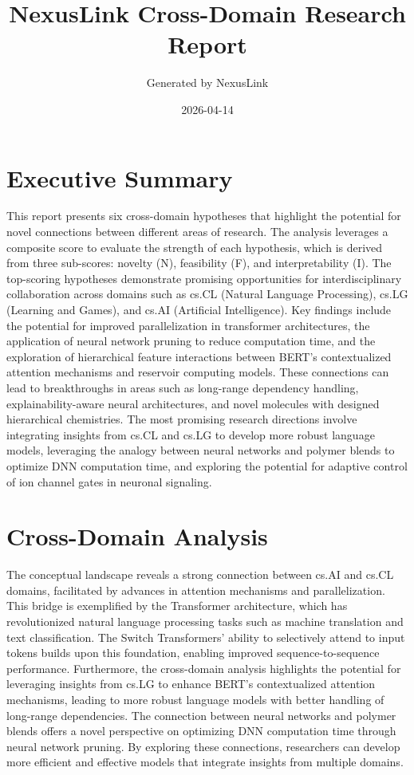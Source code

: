 \documentclass[12pt,a4paper]{article}
\title{NexusLink Cross-Domain Research Report}
\author{Generated by NexusLink}
\date{2026-04-14}
\begin{document}
\maketitle
\tableofcontents
\newpage

\section{Executive Summary}

This report presents six cross-domain hypotheses that highlight the potential for novel connections between different areas of research. The analysis leverages a composite score to evaluate the strength of each hypothesis, which is derived from three sub-scores: novelty (N), feasibility (F), and interpretability (I). The top-scoring hypotheses demonstrate promising opportunities for interdisciplinary collaboration across domains such as cs.CL (Natural Language Processing), cs.LG (Learning and Games), and cs.AI (Artificial Intelligence). Key findings include the potential for improved parallelization in transformer architectures, the application of neural network pruning to reduce computation time, and the exploration of hierarchical feature interactions between BERT's contextualized attention mechanisms and reservoir computing models. These connections can lead to breakthroughs in areas such as long-range dependency handling, explainability-aware neural architectures, and novel molecules with designed hierarchical chemistries. The most promising research directions involve integrating insights from cs.CL and cs.LG to develop more robust language models, leveraging the analogy between neural networks and polymer blends to optimize DNN computation time, and exploring the potential for adaptive control of ion channel gates in neuronal signaling.

\section{Cross-Domain Analysis}

The conceptual landscape reveals a strong connection between cs.AI and cs.CL domains, facilitated by advances in attention mechanisms and parallelization. This bridge is exemplified by the Transformer architecture, which has revolutionized natural language processing tasks such as machine translation and text classification. The Switch Transformers' ability to selectively attend to input tokens builds upon this foundation, enabling improved sequence-to-sequence performance. Furthermore, the cross-domain analysis highlights the potential for leveraging insights from cs.LG to enhance BERT's contextualized attention mechanisms, leading to more robust language models with better handling of long-range dependencies. The connection between neural networks and polymer blends offers a novel perspective on optimizing DNN computation time through neural network pruning. By exploring these connections, researchers can develop more efficient and effective models that integrate insights from multiple domains.
\end{document}
